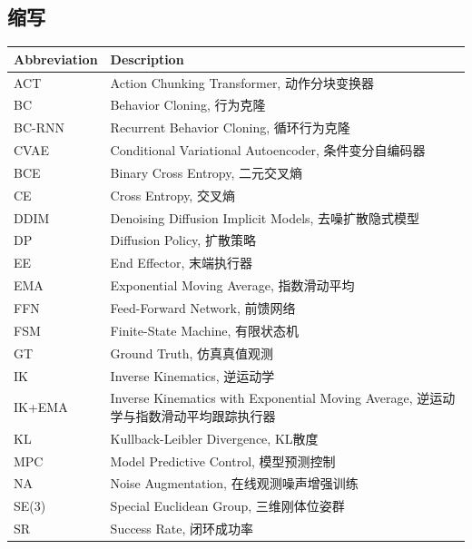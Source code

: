 \subsection*{缩写}
\begin{center}
\small
\renewcommand{\arraystretch}{1.12}
\begin{tabular}{>{\centering\arraybackslash}p{}p{}}
\hline
\textbf{Abbreviation} & \textbf{Description} \\
\hline
ACT & Action Chunking Transformer, 动作分块变换器 \\
BC & Behavior Cloning, 行为克隆 \\
BC-RNN & Recurrent Behavior Cloning, 循环行为克隆 \\
CVAE & Conditional Variational Autoencoder, 条件变分自编码器 \\
BCE & Binary Cross Entropy, 二元交叉熵 \\
CE & Cross Entropy, 交叉熵 \\
DDIM & Denoising Diffusion Implicit Models, 去噪扩散隐式模型 \\
DP & Diffusion Policy, 扩散策略 \\
EE & End Effector, 末端执行器 \\
EMA & Exponential Moving Average, 指数滑动平均 \\
FFN & Feed-Forward Network, 前馈网络 \\
FSM & Finite-State Machine, 有限状态机 \\
GT & Ground Truth, 仿真真值观测 \\
IK & Inverse Kinematics, 逆运动学 \\
IK+EMA & Inverse Kinematics with Exponential Moving Average, 逆运动学与指数滑动平均跟踪执行器 \\
KL & Kullback-Leibler Divergence, KL散度 \\
MPC & Model Predictive Control, 模型预测控制 \\
NA & Noise Augmentation, 在线观测噪声增强训练 \\
SE(3) & Special Euclidean Group, 三维刚体位姿群 \\
SR & Success Rate, 闭环成功率 \\
\hline
\end{tabular}
\end{center}
